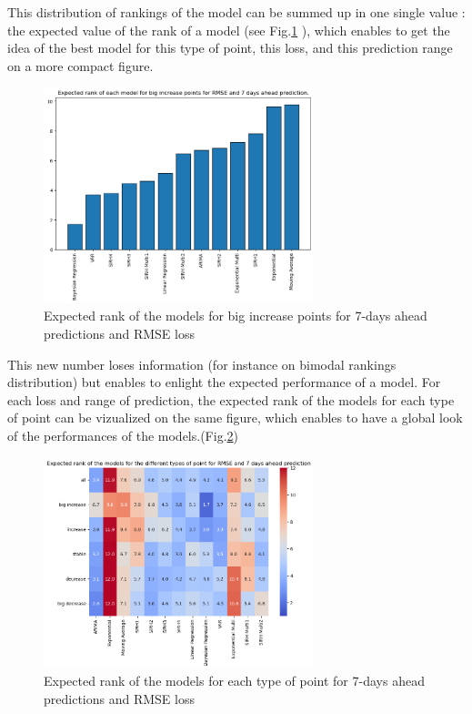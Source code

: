This distribution of rankings of the model can be summed up in one single value : the expected value of the rank of a model (see Fig.\ref{fig:expected_rank} ), which enables to get the idea of the best model for this type of point, this loss, and this prediction range on a more compact figure. 

\begin{figure}[h]
    \centering
    \includegraphics[width=0.7\textwidth]{figures/expected_ranks_big_increase_RMSE_7.png}
    \caption{Expected rank of the models for big increase points for 7-days ahead predictions and RMSE loss}
    \label{fig:expected_rank}
\end{figure}
This new number loses information (for instance on bimodal rankings distribution) but enables to enlight the expected performance of a model. 
For each loss and range of prediction, the expected rank of the models for each type of point can be vizualized on the same figure, which enables to have a global look of the performances of the models.(Fig.\ref{fig:heatmap_RMSE_7}) 
\begin{figure}[h]
    \centering
    \includegraphics[width=0.7\textwidth]{figures/heatmap_RMSE_7.png}
    \caption{Expected rank of the models for each type of point for 7-days ahead predictions and RMSE loss}
    \label{fig:heatmap_RMSE_7}
\end{figure}


